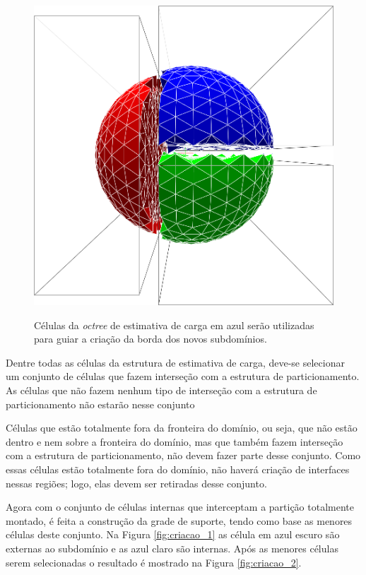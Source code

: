 \begin{figure}[!ht]
{		\begin{minipage}[c]{0.45\textwidth}{\includegraphics[width=\textwidth]{fig/esfera3.png}}\end{minipage}
	}
	\caption{Células da \textit{octree} de estimativa de carga em azul serão utilizadas para guiar a criação da borda dos novos subdomínios.}
	\label{fig:celulas_selecionadas3d}
\end{figure}


Dentre todas as células da estrutura de estimativa de carga, deve-se selecionar um conjunto de células que fazem interseção com a estrutura de particionamento. As células que não fazem nenhum tipo de interseção com a estrutura de particionamento não estarão nesse conjunto

Células que estão totalmente fora da fronteira do domínio, ou seja, que não estão dentro e nem sobre a fronteira do domínio, mas que também fazem interseção com a estrutura de particionamento, não devem fazer parte desse conjunto. Como essas células estão totalmente fora do domínio, não haverá criação de interfaces nessas regiões; logo, elas devem ser retiradas desse conjunto.

Agora com o conjunto de células internas que interceptam a partição totalmente montado, é feita a construção da grade de suporte, tendo como base as menores células deste conjunto. Na Figura \ref{fig:criacao_1} as célula em azul escuro são externas ao subdomínio e as azul claro são internas. Após as menores células serem selecionadas o resultado é mostrado na Figura \ref{fig:criacao_2}.


